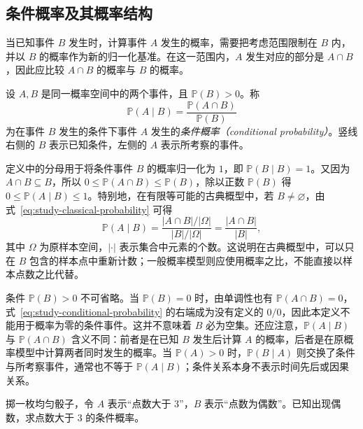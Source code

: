 \subsection{条件概率及其概率结构}
\label{subsec:study-conditional-definition}

当已知事件 $B$ 发生时，计算事件 $A$ 发生的概率，需要把考虑范围限制在 $B$ 内，并以 $B$ 的概率作为新的归一化基准。在这一范围内，$A$ 发生对应的部分是 $A\cap B$，因此应比较 $A\cap B$ 的概率与 $B$ 的概率。

\begin{definition}
\label{def:study-conditional-probability}
设 $A,B$ 是同一概率空间中的两个事件，且 $\mathbb P(B)>0$。称
\begin{equation}
  \mathbb P(A\mid B)
    =\frac{\mathbb P(A\cap B)}{\mathbb P(B)}
  \label{eq:study-conditional-probability}
\end{equation}
为在事件 $B$ 发生的条件下事件 $A$ 发生的\emph{条件概率（conditional probability）}。竖线右侧的 $B$ 表示已知条件，左侧的 $A$ 表示所考察的事件。
\end{definition}

定义中的分母用于将条件事件 $B$ 的概率归一化为 $1$，即 $\mathbb P(B\mid B)=1$。又因为 $A\cap B\subseteq B$，所以 $0\le\mathbb P(A\cap B)\le\mathbb P(B)$，除以正数 $\mathbb P(B)$ 得 $0\le\mathbb P(A\mid B)\le1$。特别地，在有限等可能的古典概型中，若 $B\ne\varnothing$，由式~\eqref{eq:study-classical-probability} 可得
\[
  \mathbb P(A\mid B)
    =\frac{|A\cap B|/|\Omega|}{|B|/|\Omega|}
    =\frac{|A\cap B|}{|B|},
\]
其中 $\Omega$ 为原样本空间，$|\cdot|$ 表示集合中元素的个数。这说明在古典概型中，可以只在 $B$ 包含的样本点中重新计数；一般概率模型则应使用概率之比，不能直接以样本点数之比代替。

条件 $\mathbb P(B)>0$ 不可省略。当 $\mathbb P(B)=0$ 时，由单调性也有 $\mathbb P(A\cap B)=0$，式~\eqref{eq:study-conditional-probability} 的右端成为没有定义的 $0/0$，因此本定义不能用于概率为零的条件事件。这并不意味着 $B$ 必为空集。还应注意，$\mathbb P(A\mid B)$ 与 $\mathbb P(A\cap B)$ 含义不同：前者是在已知 $B$ 发生后计算 $A$ 的概率，后者是在原概率模型中计算两者同时发生的概率。当 $\mathbb P(A)>0$ 时，$\mathbb P(B\mid A)$ 则交换了条件与所考察事件，通常也不等于 $\mathbb P(A\mid B)$；条件关系本身不表示时间先后或因果关系。

\begin{example}
\label{ex:study-conditional-probability-die}
掷一枚均匀骰子，令 $A$ 表示“点数大于 $3$”，$B$ 表示“点数为偶数”。已知出现偶数，求点数大于 $3$ 的条件概率。
\end{example}

